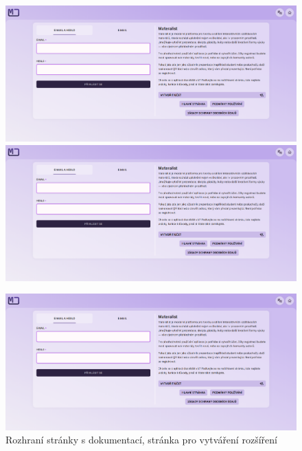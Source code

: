 \begin{figure}
\centering
\begin{minipage}{.4\textwidth}
  \centering
    \includegraphics[width=1\textwidth,page=6]{media/appendix/uzivatelskeProstredi.pdf}
\end{minipage}%
\hspace{0.1\textwidth}
\begin{minipage}{.4\textwidth}
  \centering
    \includegraphics[width=1\textwidth,page=10]{media/appendix/uzivatelskeProstredi.pdf}
\end{minipage}
\end{figure}


\begin{figure}[ht!]
    \centering
    \includegraphics[width=1\textwidth,page=8]{media/appendix/uzivatelskeProstredi.pdf}
    \caption{Rozhraní stránky s dokumentací, stránka pro vytváření rozšíření}
\end{figure}


